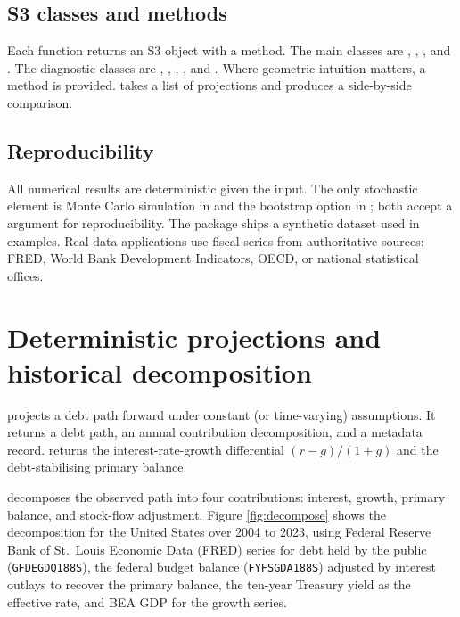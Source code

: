 \subsection{S3 classes and methods}\label{s3-classes-and-methods}

Each function returns an S3 object with a  method.
The main classes are ,
, , and . The
diagnostic classes are , ,
, , and
. Where geometric intuition matters, a
 method is provided.  takes a
list of projections and produces a side-by-side comparison.

\subsection{Reproducibility}\label{reproducibility}

All numerical results are deterministic given the input. The only
stochastic element is Monte Carlo simulation in
 and the bootstrap option in
; both accept a  argument
for reproducibility. The package ships a synthetic
 dataset used in examples. Real-data
applications use fiscal series from authoritative sources: FRED,
World Bank Development Indicators, OECD, or national statistical
offices.

\section{Deterministic projections and historical decomposition}\label{deterministic-projections-and-historical-decomposition}

 projects a debt path forward
under constant (or time-varying) assumptions. It returns a debt
path, an annual contribution decomposition, and a metadata record.
 returns the interest-rate-growth differential
\((r-g)/(1+g)\) and the debt-stabilising primary balance.

 decomposes the observed path into four
contributions: interest, growth, primary balance, and stock-flow
adjustment. Figure \ref{fig:decompose} shows the decomposition
for the United States over 2004 to 2023, using Federal Reserve
Bank of St.~Louis Economic Data (FRED) series for debt held by
the public (\texttt{GFDEGDQ188S}), the federal budget balance
(\texttt{FYFSGDA188S}) adjusted by interest outlays to recover the
primary balance, the ten-year Treasury yield as the effective
rate, and BEA GDP for the growth series.

